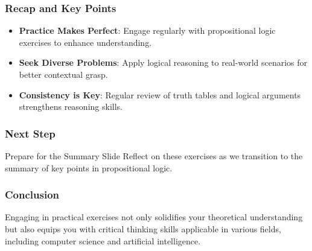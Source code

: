 \documentclass[aspectratio=169]{beamer}
\begin{document}
\begin{frame}[fragile]
    \frametitle{Recap and Key Points}
    \begin{itemize}
        \item \textbf{Practice Makes Perfect}: Engage regularly with propositional logic exercises to enhance understanding.
        \item \textbf{Seek Diverse Problems}: Apply logical reasoning to real-world scenarios for better contextual grasp.
        \item \textbf{Consistency is Key}: Regular review of truth tables and logical arguments strengthens reasoning skills.
    \end{itemize}
\end{frame}

\begin{frame}[fragile]
    \frametitle{Next Step}
    \begin{block}{Prepare for the Summary Slide}
        Reflect on these exercises as we transition to the summary of key points in propositional logic.
    \end{block}
\end{frame}

\begin{frame}[fragile]
    \frametitle{Conclusion}
    Engaging in practical exercises not only solidifies your theoretical understanding but also equips you with critical thinking skills applicable in various fields, including computer science and artificial intelligence.
\end{frame}
\end{document}
